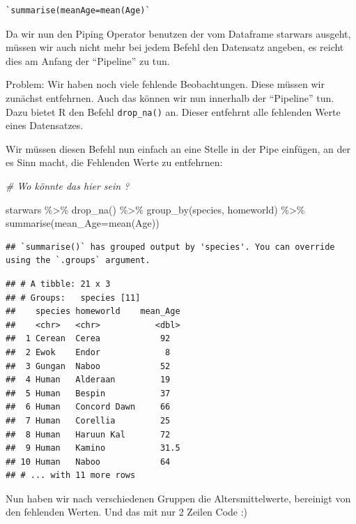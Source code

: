\documentclass[
]{book}
\newenvironment{Shaded}{\begin{snugshade}}{\end{snugshade}}
\newcommand{\AttributeTok}[1]{\textcolor[rgb]{0.77,0.63,0.00}{#1}}
\newcommand{\CommentTok}[1]{\textcolor[rgb]{0.56,0.35,0.01}{\textit{#1}}}
\newcommand{\FunctionTok}[1]{\textcolor[rgb]{0.00,0.00,0.00}{#1}}
\newcommand{\NormalTok}[1]{#1}
\newcommand{\SpecialCharTok}[1]{\textcolor[rgb]{0.00,0.00,0.00}{#1}}
\theoremstyle{definition}
\theoremstyle{definition}
\theoremstyle{definition}
\theoremstyle{definition}
\theoremstyle{remark}
\begin{document}
\begin{verbatim}
`summarise(meanAge=mean(Age)`
\end{verbatim}

Da wir nun den Piping Operator benutzen der vom Dataframe starwars ausgeht, müssen wir auch nicht mehr bei jedem Befehl den Datensatz angeben, es reicht dies am Anfang der ``Pipeline'' zu tun.

Problem: Wir haben noch viele fehlende Beobachtungen. Diese müssen wir zunächst entfehrnen. Auch das können wir nun innerhalb der ``Pipeline'' tun. Dazu bietet R den Befehl \texttt{drop\_na()} an. Dieser entfehrnt alle fehlenden Werte eines Datensatzes.

Wir müssen diesen Befehl nun einfach an eine Stelle in der Pipe einfügen, an der es Sinn macht, die Fehlenden Werte zu entfehrnen:

\begin{Shaded}
\begin{Highlighting}[]
\CommentTok{\# Wo könnte das hier sein ? }

\NormalTok{starwars }\SpecialCharTok{\%\textgreater{}\%} \FunctionTok{drop\_na}\NormalTok{() }\SpecialCharTok{\%\textgreater{}\%}
  \FunctionTok{group\_by}\NormalTok{(species, homeworld) }\SpecialCharTok{\%\textgreater{}\%} 
  \FunctionTok{summarise}\NormalTok{(}\AttributeTok{mean\_Age=}\FunctionTok{mean}\NormalTok{(Age))}
\end{Highlighting}
\end{Shaded}

\begin{verbatim}
## `summarise()` has grouped output by 'species'. You can override using the `.groups` argument.
\end{verbatim}

\begin{verbatim}
## # A tibble: 21 x 3
## # Groups:   species [11]
##    species homeworld    mean_Age
##    <chr>   <chr>           <dbl>
##  1 Cerean  Cerea            92  
##  2 Ewok    Endor             8  
##  3 Gungan  Naboo            52  
##  4 Human   Alderaan         19  
##  5 Human   Bespin           37  
##  6 Human   Concord Dawn     66  
##  7 Human   Corellia         25  
##  8 Human   Haruun Kal       72  
##  9 Human   Kamino           31.5
## 10 Human   Naboo            64  
## # ... with 11 more rows
\end{verbatim}

Nun haben wir nach verschiedenen Gruppen die Altersmittelwerte, bereinigt von den fehlenden Werten. Und das mit nur 2 Zeilen Code :)
\end{document}
